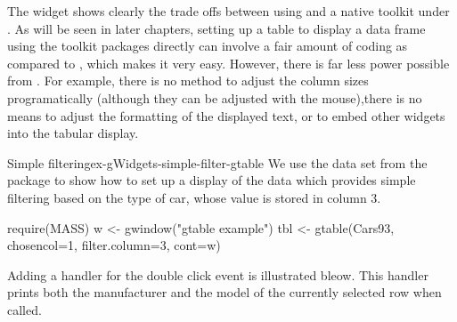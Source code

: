 The  widget shows clearly the trade offs between
using  and a native toolkit under \R. As will be seen in
later chapters, setting up a table to display a data frame using the
toolkit packages directly can involve a fair amount of
coding as compared to , which makes it very
easy. However, there is far less power possible from
. For example, there is no method to adjust the column
sizes programatically (although they can be adjusted with the
mouse),there is no means to adjust the formatting of the displayed
text, or to embed other widgets into the tabular display.

\begin{example}{Simple filtering}{ex-gWidgets-simple-filter-gtable}
  We use the  data set from the  package to
  show how to set up a display of the data which provides simple
  filtering based on the type of car, whose value is stored in column 3.
  
\begin{Schunk}
\begin{Sinput}
 require(MASS)
 w <- gwindow("gtable example")
 tbl <- gtable(Cars93, chosencol=1, filter.column=3, cont=w)
\end{Sinput}
\end{Schunk}

Adding a handler for the double click event is illustrated bleow. This
handler prints both the manufacturer and the model of the currently
selected row when called.
\begin{Schunk}
\end{Schunk}
\end{example}



